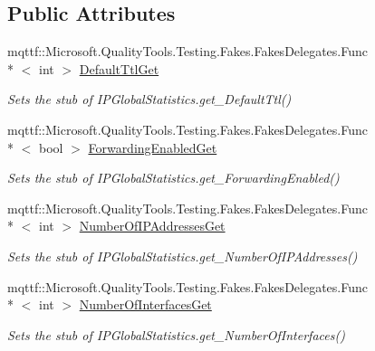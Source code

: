 \subsection*{Public Attributes}
\begin{DoxyCompactItemize}
\item 
mqttf\-::\-Microsoft.\-Quality\-Tools.\-Testing.\-Fakes.\-Fakes\-Delegates.\-Func\\*
$<$ int $>$ \hyperlink{class_system_1_1_net_1_1_network_information_1_1_fakes_1_1_stub_i_p_global_statistics_a3f652754365a9ef5ee09ce79eb4de805}{Default\-Ttl\-Get}
\begin{DoxyCompactList}\small\item\em Sets the stub of I\-P\-Global\-Statistics.\-get\-\_\-\-Default\-Ttl()\end{DoxyCompactList}\item 
mqttf\-::\-Microsoft.\-Quality\-Tools.\-Testing.\-Fakes.\-Fakes\-Delegates.\-Func\\*
$<$ bool $>$ \hyperlink{class_system_1_1_net_1_1_network_information_1_1_fakes_1_1_stub_i_p_global_statistics_acf5872283ba7021a46fd6ee3375a79f0}{Forwarding\-Enabled\-Get}
\begin{DoxyCompactList}\small\item\em Sets the stub of I\-P\-Global\-Statistics.\-get\-\_\-\-Forwarding\-Enabled()\end{DoxyCompactList}\item 
mqttf\-::\-Microsoft.\-Quality\-Tools.\-Testing.\-Fakes.\-Fakes\-Delegates.\-Func\\*
$<$ int $>$ \hyperlink{class_system_1_1_net_1_1_network_information_1_1_fakes_1_1_stub_i_p_global_statistics_a7baeb7accbf4d3823338989ffa08d01c}{Number\-Of\-I\-P\-Addresses\-Get}
\begin{DoxyCompactList}\small\item\em Sets the stub of I\-P\-Global\-Statistics.\-get\-\_\-\-Number\-Of\-I\-P\-Addresses()\end{DoxyCompactList}\item 
mqttf\-::\-Microsoft.\-Quality\-Tools.\-Testing.\-Fakes.\-Fakes\-Delegates.\-Func\\*
$<$ int $>$ \hyperlink{class_system_1_1_net_1_1_network_information_1_1_fakes_1_1_stub_i_p_global_statistics_ac22f22f3d5d828e609edb9da85550f2c}{Number\-Of\-Interfaces\-Get}
\begin{DoxyCompactList}\small\item\em Sets the stub of I\-P\-Global\-Statistics.\-get\-\_\-\-Number\-Of\-Interfaces()\end{DoxyCompactList}\item 

\end{DoxyCompactItemize}
